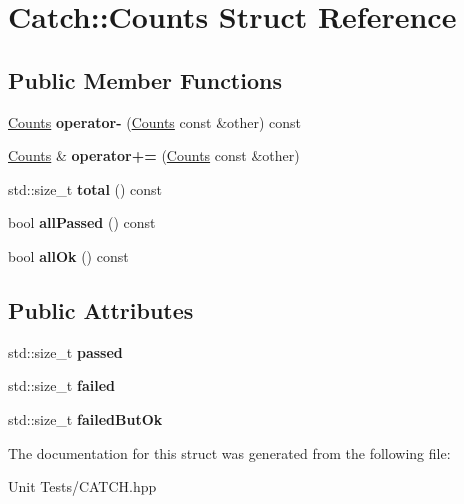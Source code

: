 \hypertarget{structCatch_1_1Counts}{}\section{Catch\+:\+:Counts Struct Reference}
\label{structCatch_1_1Counts}
\subsection*{Public Member Functions}
\begin{DoxyCompactItemize}
\item 
\hyperlink{structCatch_1_1Counts}{Counts} {\bfseries operator-\/} (\hyperlink{structCatch_1_1Counts}{Counts} const \&other) const \hypertarget{structCatch_1_1Counts_aedf86fefe33938d132a6981171cd83e6}{}\label{structCatch_1_1Counts_aedf86fefe33938d132a6981171cd83e6}

\item 
\hyperlink{structCatch_1_1Counts}{Counts} \& {\bfseries operator+=} (\hyperlink{structCatch_1_1Counts}{Counts} const \&other)\hypertarget{structCatch_1_1Counts_a322a89475cd2cc039140ef371e973677}{}\label{structCatch_1_1Counts_a322a89475cd2cc039140ef371e973677}

\item 
std\+::size\+\_\+t {\bfseries total} () const \hypertarget{structCatch_1_1Counts_a9125c662e30114e5c5cc94729b1e9e84}{}\label{structCatch_1_1Counts_a9125c662e30114e5c5cc94729b1e9e84}

\item 
bool {\bfseries all\+Passed} () const \hypertarget{structCatch_1_1Counts_adbbaca552f6017ce69e0d5dc5500bea4}{}\label{structCatch_1_1Counts_adbbaca552f6017ce69e0d5dc5500bea4}

\item 
bool {\bfseries all\+Ok} () const \hypertarget{structCatch_1_1Counts_ab2497c9dfc77be757a90225ea69595f5}{}\label{structCatch_1_1Counts_ab2497c9dfc77be757a90225ea69595f5}

\end{DoxyCompactItemize}
\subsection*{Public Attributes}
\begin{DoxyCompactItemize}
\item 
std\+::size\+\_\+t {\bfseries passed}\hypertarget{structCatch_1_1Counts_ad28daaf3de28006400208b6dd0c631e6}{}\label{structCatch_1_1Counts_ad28daaf3de28006400208b6dd0c631e6}

\item 
std\+::size\+\_\+t {\bfseries failed}\hypertarget{structCatch_1_1Counts_a19982a3817a3bc2c07f0290e71f497a3}{}\label{structCatch_1_1Counts_a19982a3817a3bc2c07f0290e71f497a3}

\item 
std\+::size\+\_\+t {\bfseries failed\+But\+Ok}\hypertarget{structCatch_1_1Counts_ac090973a2ff51394cd452718e75c073e}{}\label{structCatch_1_1Counts_ac090973a2ff51394cd452718e75c073e}

\end{DoxyCompactItemize}


The documentation for this struct was generated from the following file\+:\begin{DoxyCompactItemize}
\item 
Unit Tests/C\+A\+T\+C\+H.\+hpp\end{DoxyCompactItemize}

